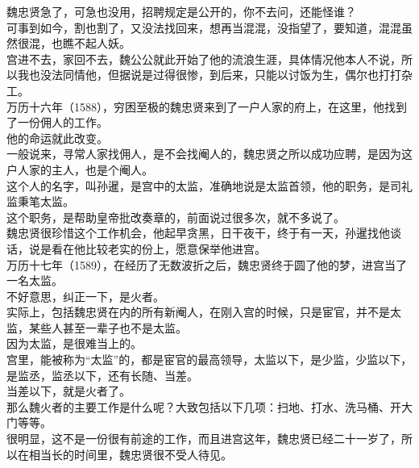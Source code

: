 \begin{multicols}{\theparacolNo}
魏忠贤急了，可急也没用，招聘规定是公开的，你不去问，还能怪谁？\\

可事到如今，割也割了，又没法找回来，想再当混混，没指望了，要知道，混混虽然很混，也瞧不起人妖。\\

宫进不去，家回不去，魏公公就此开始了他的流浪生涯，具体情况他本人不说，所以我也没法同情他，但据说是过得很惨，到后来，只能以讨饭为生，偶尔也打打杂工。\\

万历十六年（1588），穷困至极的魏忠贤来到了一户人家的府上，在这里，他找到了一份佣人的工作。\\

他的命运就此改变。\\

一般说来，寻常人家找佣人，是不会找阉人的，魏忠贤之所以成功应聘，是因为这户人家的主人，也是个阉人。\\

这个人的名字，叫孙暹，是宫中的太监，准确地说是太监首领，他的职务，是司礼监秉笔太监。\\

这个职务，是帮助皇帝批改奏章的，前面说过很多次，就不多说了。\\

魏忠贤很珍惜这个工作机会，他起早贪黑，日干夜干，终于有一天，孙暹找他谈话，说是看在他比较老实的份上，愿意保举他进宫。\\

万历十七年（1589），在经历了无数波折之后，魏忠贤终于圆了他的梦，进宫当了一名太监。\\

不好意思，纠正一下，是火者。\\

实际上，包括魏忠贤在内的所有新阉人，在刚入宫的时候，只是宦官，并不是太监，某些人甚至一辈子也不是太监。\\

因为太监，是很难当上的。\\

宫里，能被称为“太监”的，都是宦官的最高领导，太监以下，是少监，少监以下，是监丞，监丞以下，还有长随、当差。\\

当差以下，就是火者了。\\

那么魏火者的主要工作是什么呢？大致包括以下几项：扫地、打水、洗马桶、开大门等等。\\

很明显，这不是一份很有前途的工作，而且进宫这年，魏忠贤已经二十一岁了，所以在相当长的时间里，魏忠贤很不受人待见。\\


\end{multicols}
